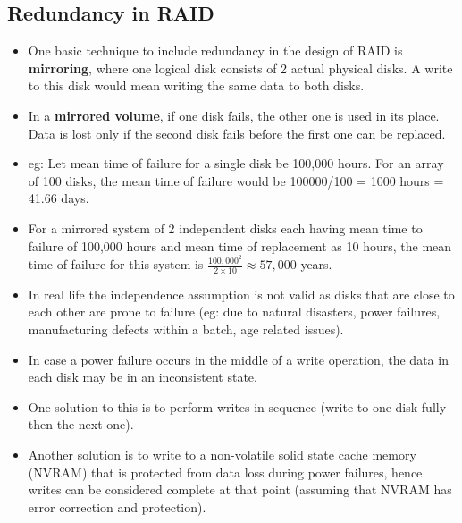 \documentclass{article}
\theoremstyle{plain}
\theoremstyle{definition}
\begin{document}
\subsection{Redundancy in RAID}
\begin{itemize}
    \item One basic technique to include redundancy in the design of RAID is \textbf{mirroring}, where one logical disk consists of 2 actual physical disks. A write to this disk would mean writing the same data to both disks.
    
    \item In a \textbf{mirrored volume}, if one disk fails, the other one is used in its place. Data is lost only if the second disk fails before the first one can be replaced.
    
    \item eg: Let mean time of failure for a single disk be 100,000 hours. For an array of 100 disks, the mean time of failure would be 100000/100  = 1000 hours = 41.66 days.
    
    \item For a mirrored system of 2 independent disks each having mean time to failure of 100,000 hours and mean time of replacement as 10 hours, the mean time of failure for this system is $\frac{100,000^2}{2 \times 10}  \approx 57,000$ years.
    
    \item In real life the independence assumption is not valid as disks that are close to each other are prone to failure (eg: due to natural disasters, power failures, manufacturing defects within a batch, age related issues). 
    
    \item In case a power failure occurs in the middle of a write operation, the data in each disk may be in an inconsistent state. 
    
    \item One solution to this is to perform writes in sequence (write to one disk fully then the next one).
    
    \item Another solution is to write to a non-volatile solid state cache memory (NVRAM) that is protected from data loss during power failures, hence writes can be considered complete at that point (assuming that NVRAM has error correction and protection).
\end{itemize}
\end{document}
